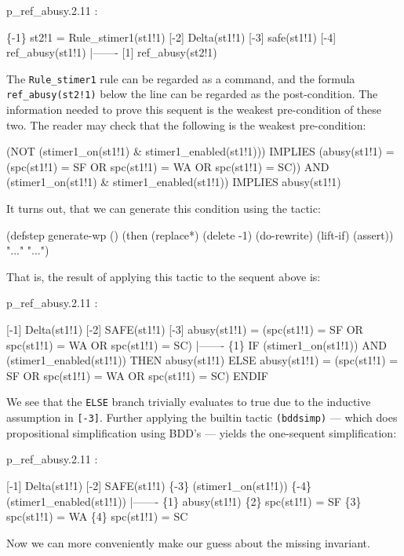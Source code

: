 \begin{smallsession}
  p_ref_abusy.2.11 :  

  \{-1\}   st2!1 = Rule_stimer1(st1!1)
  [-2]   Delta(st1!1)
  [-3]   safe(st1!1)
  [-4]   ref_abusy(st1!1)
    |-------
  [1]   ref_abusy(st2!1)
\end{smallsession}

The  {\tt Rule\_stimer1} rule can  be  regarded as  a command, and the
formula {\tt ref\_abusy(st2!1)} below  the line can  be regarded as the
post-condition.   The information needed  to prove  this sequent is
the weakest pre-condition of these two. The reader may check that
the following is the weakest pre-condition:

\begin{smallsession}
  (NOT (stimer1_on(st1!1) & stimer1_enabled(st1!1))) IMPLIES
      (abusy(st1!1) = (spc(st1!1) = SF OR 
                       spc(st1!1) = WA OR 
                       spc(st1!1) = SC))
  AND
  (stimer1_on(st1!1) & stimer1_enabled(st1!1)) IMPLIES 
      abusy(st1!1)
\end{smallsession}

It turns out, that we can generate this condition using the tactic:

\begin{smallsession}
  (defstep generate-wp ()
    (then
      (replace*)
      (delete -1)
      (do-rewrite)
      (lift-if)
      (assert))
  "..."
  "...")
\end{smallsession}

That is, the result of applying this tactic to the sequent above is:

\begin{smallsession}
  p_ref_abusy.2.11 :  

  [-1]   Delta(st1!1)
  [-2]   SAFE(st1!1)
  [-3]   abusy(st1!1) = 
           (spc(st1!1) = SF OR spc(st1!1) = WA OR spc(st1!1) = SC)
    |-------
  \{1\}   IF (stimer1_on(st1!1)) AND (stimer1_enabled(st1!1)) THEN 
          abusy(st1!1)
        ELSE 
          abusy(st1!1) = 
            (spc(st1!1) = SF OR spc(st1!1) = WA OR spc(st1!1) = SC)
        ENDIF
\end{smallsession}

We see that the {\tt  ELSE} branch trivially evaluates  to true due to
the inductive assumption    in  {\tt [-3]}.   Further applying   the
builtin tactic     {\tt  (bddsimp)}  --- which    does   propositional
simplification using BDD's --- yields the one-sequent simplification:

\begin{smallsession}
p_ref_abusy.2.11 :  

[-1]   Delta(st1!1)
[-2]   SAFE(st1!1)
\{-3\}   (stimer1_on(st1!1))
\{-4\}   (stimer1_enabled(st1!1))
  |-------
\{1\}   abusy(st1!1)
\{2\}   spc(st1!1) = SF
\{3\}   spc(st1!1) = WA
\{4\}   spc(st1!1) = SC
\end{smallsession}

Now we can more conveniently make our guess about the missing invariant.


